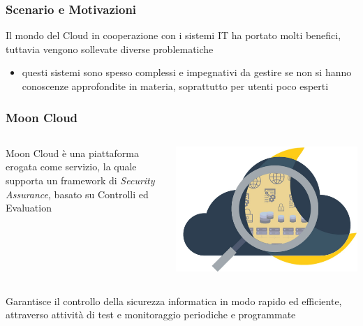 \frame{\titlepage}

\begin{frame}
    \frametitle{Scenario e Motivazioni}
    Il mondo del Cloud in cooperazione con i sistemi IT ha portato molti benefici, tuttavia vengono sollevate diverse problematiche
    \begin{itemize}
        \item questi sistemi sono spesso \alert{complessi e impegnativi da gestire} se non si hanno conoscenze approfondite in materia, 
        soprattutto per utenti poco esperti
    \end{itemize}
\end{frame}

\begin{frame}
    \frametitle{Moon Cloud}
    \begin{columns}
        \begin{column}{0.55\textwidth}
            Moon Cloud è una piattaforma erogata come servizio, la quale supporta un framework di \alert{\textit{Security Assurance}}, 
            basato su Controlli ed Evaluation
        \end{column}
        \begin{column}{0.4\textwidth}
            \begin{center}
                \includegraphics[scale=0.12]{images/mc}
            \end{center}
        \end{column}
    \end{columns}
    Garantisce il controllo della sicurezza informatica in modo rapido ed efficiente, attraverso attività di test e monitoraggio 
    periodiche e programmate
\end{frame}

